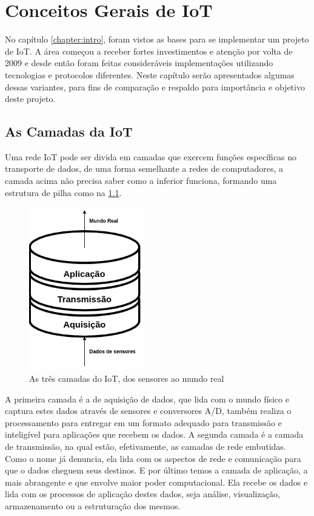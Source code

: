 \chapter{Conceitos Gerais de IoT}
\label{chapter:coneceitos}

No capítulo \ref{chapter:intro}, foram vistos as bases para se implementar um projeto de IoT. A área começou a receber fortes investimentos e atenção por volta de 2009 \cite{Rampim:iot} e desde então foram feitas consideráveis implementações utilizando tecnologias e protocolos diferentes. Neste capítulo serão apresentados algumas dessas variantes, para fins de comparação e respaldo para importância e objetivo deste projeto.

\section{As Camadas da IoT}
\label{section:camadas_iot}

Uma rede IoT pode ser divida em camadas que exercem funções específicas no transporte de dados, de uma forma semelhante a redes de computadores, a camada acima não precisa saber como a inferior funciona, formando uma estrutura de pilha como na \ref{fig:1.2.0/camadas_iot}.

\begin{figure}[h!]
\centering
\includegraphics[width=5cm]{./02_Capitulos/02_Cap1/figures/iot_stack}
\caption{As três camadas do IoT, dos sensores ao mundo real}
\label{fig:1.2.0/camadas_iot}
\end{figure}

A primeira camada é a de aquisição de dados, que lida com o mundo físico e captura estes dados através de sensores e conversores A/D, também realiza o processamento para entregar em um formato adequado para transmissão e inteligível para aplicações que recebem os dados. A segunda camada é a camada de transmissão, na qual estão, efetivamente, as camadas de rede embutidas. Como o nome já denuncia, ela lida com os aspectos de rede e comunicação para que o dados cheguem seus destinos. E por último temos a camada de aplicação, a mais abrangente e que envolve maior poder computacional. Ela recebe os dados e lida com os processos de aplicação destes dados, seja análise, visualização, armazenamento ou a estruturação dos mesmos.

